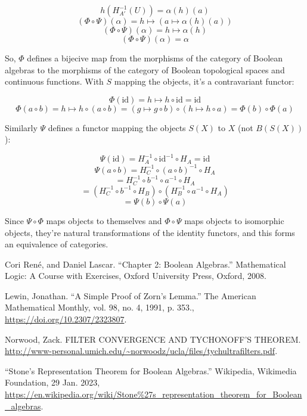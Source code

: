 \documentclass{article}
\begin{document}
      \[ h ( H_{A'}^{-1} (U)) = \alpha(h)(a)\] \[(\Phi \circ \Psi)(\alpha) = h
      \mapsto (a \mapsto \alpha(h)(a))\] \[(\Phi \circ \Psi)(\alpha) =  h
      \mapsto \alpha(h)\] \[(\Phi \circ \Psi)(\alpha) = \alpha\]

      So, $\Phi$ defines a bijecive map from the morphisms of the category of Boolean
      algebras to the morphisms of the category of Boolean
      topological spaces and continuous functions. With $S$ mapping the objects,
      it's a contravariant functor:

      \[ \Phi(\text{id}) = h \mapsto h \circ \text{id} = \text{id} \]
      \[ \Phi(a \circ b) = h \mapsto h \circ (a \circ b) = (g \mapsto g \circ b)
      \circ (h \mapsto h \circ a) = \Phi(b) \circ \Phi(a) \]

      Similarly $\Psi$ defines a functor mapping the objects $S(X)$ to $X$ (not
      $B(S(X))$):

      \[ \Psi(\text{id}) = H_A^{-1} \circ \text{id}^{-1} \circ H_A = \text{id} \]
      \[ \Psi(a \circ b) = H_C^{-1} \circ (a \circ b)^{-1} \circ H_A \]
      \[ = H_C^{-1} \circ b^{-1} \circ a^{-1} \circ H_A \]
      \[ = (H_C^{-1} \circ b^{-1} \circ H_B) \circ (H_B^{-1} \circ a^{-1} \circ
      H_A) \]
      \[ = \Psi(b) \circ \Psi(a) \]

      Since $\Psi \circ \Phi$ maps objects to themselves and $\Phi \circ \Psi$
      maps objects to isomorphic objects, they're natural transformations of the
      identity functors, and this forms an equivalence of categories.

    \clearpage

    \begin{thebibliography}{9}

       Cori Ren\'e, and Daniel Lascar. “Chapter 2: Boolean
      Algebras.” Mathematical Logic: A Course with Exercises, Oxford University
      Press, Oxford, 2008. 

       Lewin, Jonathan. “A Simple Proof of Zorn's Lemma.” The
      American Mathematical Monthly, vol. 98, no. 4, 1991, p. 353.,
      \url{https://doi.org/10.2307/2323807}.

       Norwood, Zack. FILTER CONVERGENCE AND TYCHONOFF’S THEOREM.
      \url{http://www-personal.umich.edu/~norwoodz/ucla/files/tychultrafilters.pdf}.

       “Stone's Representation Theorem for Boolean Algebras.”
      Wikipedia, Wikimedia Foundation, 29 Jan. 2023,
      \url{https://en.wikipedia.org/wiki/Stone%27s_representation_theorem_for_Boolean_algebras}.

    \end{thebibliography}
\end{document}
